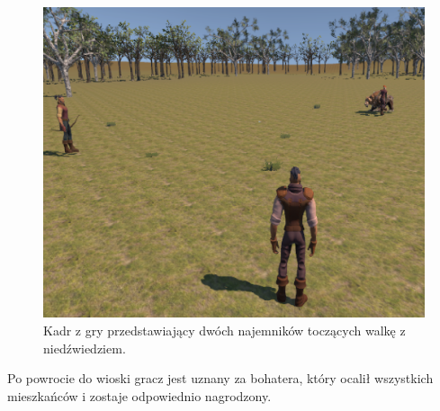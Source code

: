 \begin{figure}[h]
\centering
\includegraphics[width=1\textwidth]{images/fight}
\caption{Kadr z gry przedstawiający dwóch najemników toczących walkę z niedźwiedziem.}
\end{figure}
\FloatBarrier

Po powrocie do wioski gracz jest uznany za bohatera, który ocalił wszystkich mieszkańców i zostaje odpowiednio nagrodzony.

